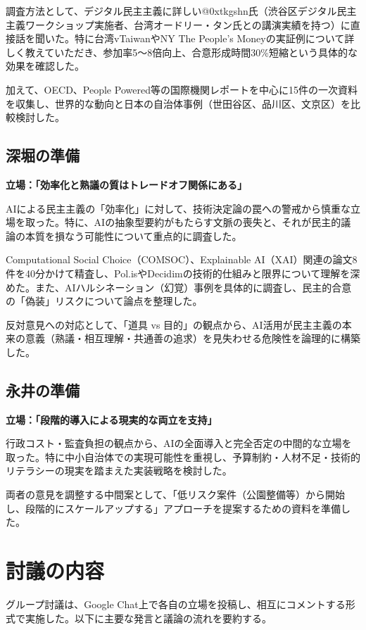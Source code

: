 \documentclass[12pt,a4j]{jarticle}
\begin{document}
調査方法として、デジタル民主主義に詳しい@0xtkgshn氏（渋谷区デジタル民主主義ワークショップ実施者、台湾オードリー・タン氏との講演実績を持つ）に直接話を聞いた。特に台湾vTaiwanやNY The People's Moneyの実証例について詳しく教えていただき、参加率5～8倍向上、合意形成時間30\%短縮という具体的な効果を確認した。

加えて、OECD、People Powered等の国際機関レポートを中心に15件の一次資料を収集し、世界的な動向と日本の自治体事例（世田谷区、品川区、文京区）を比較検討した。

\subsection{深堀の準備}
\textbf{立場：「効率化と熟議の質はトレードオフ関係にある」}

AIによる民主主義の「効率化」に対して、技術決定論の罠への警戒から慎重な立場を取った。特に、AIの抽象型要約がもたらす文脈の喪失と、それが民主的議論の本質を損なう可能性について重点的に調査した。

Computational Social Choice（COMSOC）、Explainable AI（XAI）関連の論文8件を40分かけて精査し、Pol.isやDecidimの技術的仕組みと限界について理解を深めた。また、AIハルシネーション（幻覚）事例を具体的に調査し、民主的合意の「偽装」リスクについて論点を整理した。

反対意見への対応として、「道具 vs 目的」の観点から、AI活用が民主主義の本来の意義（熟議・相互理解・共通善の追求）を見失わせる危険性を論理的に構築した。

\subsection{永井の準備}
\textbf{立場：「段階的導入による現実的な両立を支持」}

行政コスト・監査負担の観点から、AIの全面導入と完全否定の中間的な立場を取った。特に中小自治体での実現可能性を重視し、予算制約・人材不足・技術的リテラシーの現実を踏まえた実装戦略を検討した。

両者の意見を調整する中間案として、「低リスク案件（公園整備等）から開始し、段階的にスケールアップする」アプローチを提案するための資料を準備した。

\section{討議の内容}

グループ討議は、Google Chat上で各自の立場を投稿し、相互にコメントする形式で実施した。以下に主要な発言と議論の流れを要約する。
\end{document}

